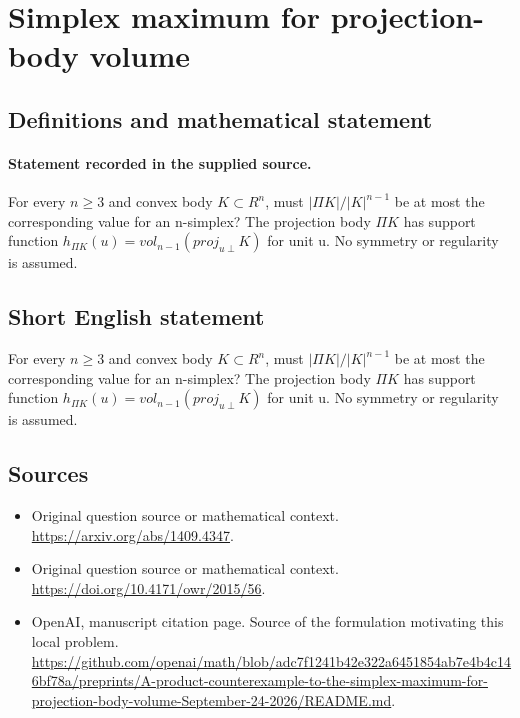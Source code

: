 \documentclass[11pt]{article}
\begin{document}
\section*{Simplex maximum for projection-body volume}\label{statement}
\subsection{Definitions and mathematical statement}
\paragraph{Statement recorded in the supplied source.}
For every $n\geq 3$ and convex body $K\subset R^{n}$, must $|\Pi K|/|K|^{n-1}$ be at most the corresponding value for an n-simplex? The projection body $\Pi K$ has support function $h_{\Pi K}(u)=vol_{n-1}(proj_{u\perp }K)$ for unit u. No symmetry or regularity is assumed.
\subsection{Short English statement}
For every $n\geq 3$ and convex body $K\subset R^{n}$, must $|\Pi K|/|K|^{n-1}$ be at most the corresponding value for an n-simplex? The projection body $\Pi K$ has support function $h_{\Pi K}(u)=vol_{n-1}(proj_{u\perp }K)$ for unit u. No symmetry or regularity is assumed.
\subsection{Sources}
\begin{itemize}
\item[S1] Original question source or mathematical context.
\url{https://arxiv.org/abs/1409.4347}.
\item[S2] Original question source or mathematical context.
\url{https://doi.org/10.4171/owr/2015/56}.
\item[S3] OpenAI, manuscript citation page. Source of the formulation motivating this local problem.
\url{https://github.com/openai/math/blob/adc7f1241b42e322a6451854ab7e4b4c146bf78a/preprints/A-product-counterexample-to-the-simplex-maximum-for-projection-body-volume-September-24-2026/README.md}.
\end{itemize}
\end{document}
